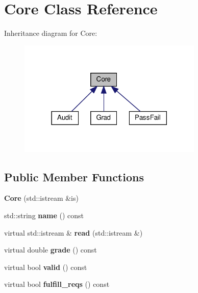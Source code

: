 \hypertarget{classCore}{}\section{Core Class Reference}
\label{classCore}


Inheritance diagram for Core\+:\nopagebreak
\begin{figure}[H]
\begin{center}
\leavevmode
\includegraphics[width=249pt]{classCore__inherit__graph}
\end{center}
\end{figure}
\subsection*{Public Member Functions}
\begin{DoxyCompactItemize}
\item 
\mbox{\label{classCore_ad1013e09510ddff40c114943de99093f}} 
{\bfseries Core} (std\+::istream \&is)
\item 
\mbox{\label{classCore_a60d51fbac9805972bac7b117af8f1a54}} 
std\+::string {\bfseries name} () const
\item 
\mbox{\label{classCore_ae3bbc66cb3733082f8537d438c0521d6}} 
virtual std\+::istream \& {\bfseries read} (std\+::istream \&)
\item 
\mbox{\label{classCore_a0d609cb4037c6dfe99ce0d68c1d69f04}} 
virtual double {\bfseries grade} () const
\item 
\mbox{\label{classCore_a557816073236f9ed9fa91edbb9cea451}} 
virtual bool {\bfseries valid} () const
\item 
\mbox{\label{classCore_a81f50dc6932b75f6dbd7c9014bf23644}} 
virtual bool {\bfseries fulfill\+\_\+reqs} () const
\end{DoxyCompactItemize}
